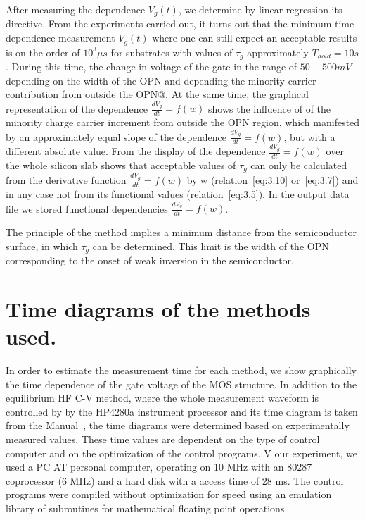 After measuring the dependence $V_{g}(t)$, we determine by linear
regression its directive. From the experiments carried out, it turns
out that the minimum time dependence measurement $V_{g}(t)$ where one
can still expect an acceptable results is on the order of
$10^{3}\mu{s}$ for substrates with values of $\tau_g$ approximately
$T_{hold}=10s$. During this time, the change in voltage of the gate in
the range of $50-500 mV$ depending on the width of the OPN and
depending the minority carrier contribution from outside the OPN@. At
the same time, the graphical representation of the dependence
$\frac{dV_g}{dt}=f(w)$ shows the influence of of the minority charge
carrier increment from outside the OPN region, which manifested by an
approximately equal slope of the dependence $\frac{dV_g}{dt}=f(w)$,
but with a different absolute value. From the display of the
dependence $\frac{dV_g}{dt}=f(w)$ over the whole silicon slab shows
that acceptable values of $\tau_{g}$ can only be calculated from the
derivative function $\frac{dV_g}{dt}=f(w)$ by w
(relation~\ref{eq:3.10} or~\ref{eq:3.7}) and in any case not from its
functional values (relation~\ref{eq:3.5}). In the output data file we
stored functional dependencies $\frac{dV_g}{dt}=f(w)$.

The principle of the method implies a minimum distance from the
semiconductor surface, in which $\tau_{g}$ can be determined. This
limit is the width of the OPN corresponding to the onset of weak
inversion in the semiconductor.

\section{Time diagrams of the methods used.}\label{sec:5.4}

In order to estimate the measurement time for each method, we show
graphically the time dependence of the gate voltage of the MOS
structure. In addition to the equilibrium HF C-V method, where the
whole measurement waveform is controlled by by the HP4280a instrument
processor and its time diagram is taken from the Manual~\cite{5.7},
the time diagrams were determined based on experimentally measured
values. These time values are dependent on the type of control
computer and on the optimization of the control programs. V our
experiment, we used a PC AT personal computer, operating on 10 MHz
with an 80287 coprocessor (6 MHz) and a hard disk with a access time
of 28 ms. The control programs were compiled without optimization for
speed using an emulation library of subroutines for mathematical
floating point operations.

